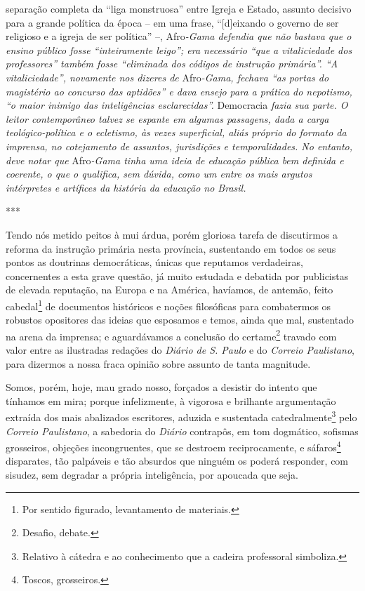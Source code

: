 \begin{didascalia}
{separação completa da ``liga monstruosa'' entre Igreja e Estado, assunto
decisivo para a grande política da época -- em uma frase,
``{[}d{]}eixando o governo de ser religioso e a igreja de ser política''
--,} Afro\emph{-Gama defendia que não bastava que o ensino público fosse
``inteiramente leigo''; era necessário ``que a vitaliciedade dos
professores'' também fosse ``eliminada dos códigos de instrução primária''.
``A vitaliciedade'', novamente nos dizeres de} Afro\emph{-Gama, fechava
``as portas do magistério ao concurso das aptidões'' e dava ensejo para a
prática do nepotismo, ``o maior inimigo das inteligências esclarecidas''.}
Democracia \emph{fazia sua parte. O leitor contemporâneo talvez se
espante em algumas passagens, dada a carga teológico-política e o
ecletismo, às vezes superficial, aliás próprio do formato da imprensa,
no cotejamento de assuntos, jurisdições e temporalidades. No entanto,
deve notar que} Afro\emph{-Gama tinha uma ideia de educação pública bem
definida e coerente, o que o qualifica, sem dúvida, como um entre os
mais argutos intérpretes e artífices da história da educação no Brasil.}
\end{didascalia}

***

Tendo nós metido peitos à mui árdua, porém gloriosa tarefa de
discutirmos a reforma da instrução primária nesta província, sustentando
em todos os seus pontos as doutrinas democráticas, únicas que reputamos
verdadeiras, concernentes a esta grave questão, já muito estudada e
debatida por publicistas de elevada reputação, na Europa e na América,
havíamos, de antemão, feito cabedal\footnote{Por sentido figurado,
  levantamento de materiais.} de documentos históricos e noções
filosóficas para combatermos os robustos opositores das ideias que
esposamos e temos, ainda que mal, sustentado na arena da imprensa; e
aguardávamos a conclusão do certame\footnote{Desafio, debate.} travado
com valor entre as ilustradas redações do \emph{Diário de S. Paulo} e do
\emph{Correio Paulistano}, para dizermos a nossa fraca opinião sobre
assunto de tanta magnitude.

Somos, porém, hoje, mau grado nosso, forçados a desistir do intento que
tínhamos em mira; porque infelizmente, à vigorosa e brilhante
argumentação extraída dos mais abalizados escritores, aduzida e
sustentada catedralmente\footnote{Relativo à cátedra e ao conhecimento
  que a cadeira professoral simboliza.} pelo \emph{Correio Paulistano},
a sabedoria do \emph{Diário} contrapôs, em tom dogmático, sofismas
grosseiros, objeções incongruentes, que se destroem reciprocamente, e
sáfaros\footnote{Toscos, grosseiros.} disparates, tão palpáveis e tão
absurdos que ninguém os poderá responder, com sisudez, sem degradar a
própria inteligência, por apoucada que seja.

